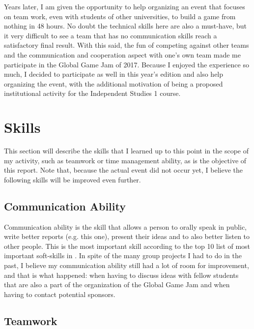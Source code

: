 \documentclass[a4paper,12pt,journal,twoside,compsoc]{PPIEEEtran}
\begin{document}
Years later, I am given the opportunity to help organizing an event that focuses on team work, even with students of other universities, to build a game from nothing in 48 hours. No doubt the technical skills here are also a must-have, but it very difficult to see a team that has no communication skills reach a satisfactory final result. With this said, the fun of competing against other teams and the communication and cooperation aspect with one's own team made me participate in the Global Game Jam of 2017. Because I enjoyed the experience so much, I decided to participate as well in this year's edition and also help organizing the event, with the additional motivation of being a proposed institutional activity for the Independent Studies 1 course.

\section{Skills}
\label{skills}
This section will describe the skills that I learned up to this point in the scope of my activity, such as teamwork or time management ability, as is the objective of this report. Note that, because the actual event did not occur yet, I believe the following skills will be improved even further.

\subsection{Communication Ability}

Communication ability is the skill that allows a person to orally speak in public, write better reports (e.g. this one), present their ideas and to also better listen to other people. This is the most important skill according to the top 10 list of most important soft-skills in \cite{executive}. In spite of the many group projects I had to do in the past, I believe my communication ability still had a lot of room for improvement, and that is what happened: when having to discuss ideas with fellow students that are also a part of the organization of the Global Game Jam and when having to contact potential sponsors. 

\subsection{Teamwork}
\end{document}
